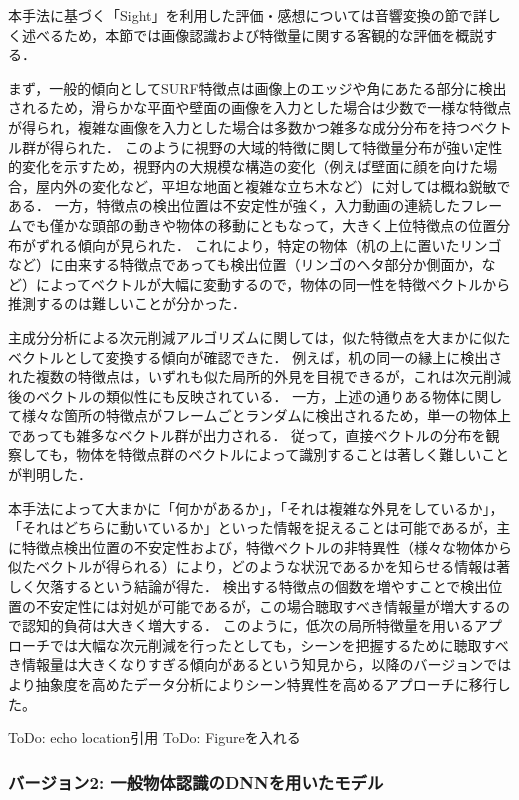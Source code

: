 本手法に基づく「Sight」を利用した評価・感想については音響変換の節で詳しく述べるため，本節では画像認識および特徴量に関する客観的な評価を概説する．

まず，一般的傾向としてSURF特徴点は画像上のエッジや角にあたる部分に検出されるため，滑らかな平面や壁面の画像を入力とした場合は少数で一様な特徴点が得られ，複雑な画像を入力とした場合は多数かつ雑多な成分分布を持つベクトル群が得られた．
このように視野の大域的特徴に関して特徴量分布が強い定性的変化を示すため，視野内の大規模な構造の変化（例えば壁面に顔を向けた場合，屋内外の変化など，平坦な地面と複雑な立ち木など）に対しては概ね鋭敏である．
一方，特徴点の検出位置は不安定性が強く，入力動画の連続したフレームでも僅かな頭部の動きや物体の移動にともなって，大きく上位特徴点の位置分布がずれる傾向が見られた．
これにより，特定の物体（机の上に置いたリンゴなど）に由来する特徴点であっても検出位置（リンゴのヘタ部分か側面か，など）によってベクトルが大幅に変動するので，物体の同一性を特徴ベクトルから推測するのは難しいことが分かった．

主成分分析による次元削減アルゴリズムに関しては，似た特徴点を大まかに似たベクトルとして変換する傾向が確認できた．
例えば，机の同一の縁上に検出された複数の特徴点は，いずれも似た局所的外見を目視できるが，これは次元削減後のベクトルの類似性にも反映されている．
一方，上述の通りある物体に関して様々な箇所の特徴点がフレームごとランダムに検出されるため，単一の物体上であっても雑多なベクトル群が出力される．
従って，直接ベクトルの分布を観察しても，物体を特徴点群のベクトルによって識別することは著しく難しいことが判明した．

本手法によって大まかに「何かがあるか」，「それは複雑な外見をしているか」，「それはどちらに動いているか」といった情報を捉えることは可能であるが，主に特徴点検出位置の不安定性および，特徴ベクトルの非特異性（様々な物体から似たベクトルが得られる）により，どのような状況であるかを知らせる情報は著しく欠落するという結論が得た．
検出する特徴点の個数を増やすことで検出位置の不安定性には対処が可能であるが，この場合聴取すべき情報量が増大するので認知的負荷は大きく増大する．
このように，低次の局所特徴量を用いるアプローチでは大幅な次元削減を行ったとしても，シーンを把握するために聴取すべき情報量は大きくなりすぎる傾向があるという知見から，以降のバージョンではより抽象度を高めたデータ分析によりシーン特異性を高めるアプローチに移行した。

ToDo: echo location引用
ToDo: Figureを入れる

\newpage
\subsubsection{バージョン2: 一般物体認識のDNNを用いたモデル}

